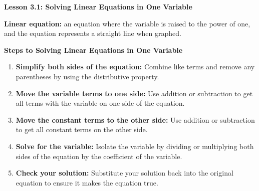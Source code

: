  \begin{center}
\textbf{Lesson 3.1: Solving Linear Equations in One Variable}
\end{center}

\vspace*{1ex}

\noindent\textbf{Linear equation:} an equation where the variable is raised to the power of one, and the equation represents a straight line when graphed. 

\noindent\textbf{Steps to Solving Linear Equations in One Variable}
\begin{enumerate}[noitemsep, label = \color{blue}\arabic*. ]
    \item \textbf{Simplify both sides of the equation:} Combine like terms and remove any parentheses by using the distributive property.
    \item \textbf{Move the variable terms to one side:} Use addition or subtraction to get all terms with the variable on one side of the equation.
    \item \textbf{Move the constant terms to the other side:} Use addition or subtraction to get all constant terms on the other side.
    \item \textbf{Solve for the variable:} Isolate the variable by dividing or multiplying both sides of the equation by the coefficient of the variable.
    \item \textbf{Check your solution:} Substitute your solution back into the original equation to ensure it makes the equation true.
\end{enumerate}



